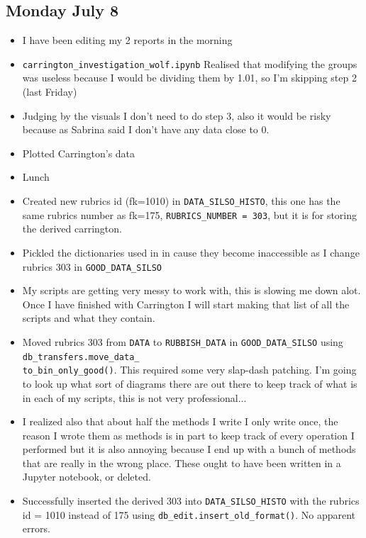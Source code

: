 \documentclass[12pt]{article}
\begin{document}
\subsection{Monday July 8}
\begin{itemize}
    \item I have been editing my 2 reports in the morning
    \item \texttt{carrington\_investigation\_wolf.ipynb} Realised that modifying the groups was useless because I would be dividing them by 1.01, so I'm skipping step 2 (last Friday)
    \item Judging by the visuals I don't need to do step 3, also it would be risky because as Sabrina said I don't have any data close to 0.
    \item Plotted Carrington's data
    \item Lunch
    \item Created new rubrics id (fk=1010) in \texttt{DATA\_SILSO\_HISTO}, this one has the same rubrics number as fk=175, \texttt{RUBRICS\_NUMBER = 303}, but it is for storing the derived carrington.
    \item Pickled the dictionaries used in  in cause they become inaccessible as I change rubrics 303 in \texttt{GOOD\_DATA\_SILSO}
    \item My scripts are getting very messy to work with, this is slowing me down alot. Once I have finished with Carrington I will start making that list of all the scripts and what they contain.
    \item Moved rubrics 303 from \texttt{DATA} to \texttt{RUBBISH\_DATA} in \texttt{GOOD\_DATA\_SILSO} using \texttt{db\_transfers.move\_data\_\\to\_bin\_only\_good()}. This required some very slap-dash patching. I'm going to look up what sort of diagrams there are out there to keep track of what is in each of my scripts, this is not very professional...
    \item I realized also that about half the methods I write I only write once, the reason I wrote them as methods is in part to keep track of every operation I performed but it is also annoying because I end up with a bunch of methods that are really in the wrong place. These ought to have been written in a Jupyter notebook, or deleted.
    \item Successfully inserted the derived 303 into \texttt{DATA\_SILSO\_HISTO} with the rubrics id = 1010 instead of 175 using \texttt{db\_edit.insert\_old\_format()}. No apparent errors.

\end{itemize}
\end{document}
